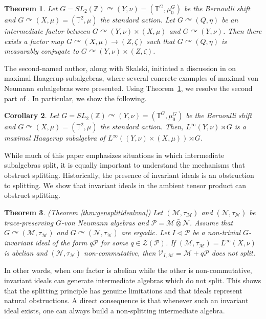 \documentclass[12pt]{amsart}
\newcommand{\cM}{{\mathcal M}}
\newcommand{\cP}{{\mathcal P}}
\newtheorem{thm}{Theorem}[section]
\newtheorem{cor}[thm]{Corollary}
\theoremstyle{definition}
\begin{document}
\begin{thm}
\label{thm:introtoricaction}
Let $G=SL_2(\mathbb{Z})\curvearrowright (Y,\nu)=(\mathbb{T}^{G},\mu_0^G)$ be the Bernoulli shift and $G\curvearrowright (X,\mu)=(\mathbb{T}^2,\mu)$ the standard action. Let $G\curvearrowright (Q,\eta)$ be an intermediate factor between $G\curvearrowright (Y,\nu)\times(X,\mu)$ and $G\curvearrowright (Y,\nu)$. Then there exists a factor map $G\curvearrowright (X,\mu)\to (Z,\zeta)$ such that $G\curvearrowright (Q,\eta)$ is measurably conjugate to $G\curvearrowright (Y,\nu)\times(Z,\zeta)$. 
\end{thm}
The second-named author, along with Skalski, initiated a discussion in \cite{jiangskalski} on maximal Haagerup subalgebras, where several concrete examples of maximal von Neumann subalgebras were presented. Using Theorem~\ref{thm:introtoricaction}, we resolve the second part of \cite[Problem~5.2]{jiangskalski}. In particular, we show the following. 
\begin{cor} 
\label{cor:mainmaximalhaagerup}
Let $G=SL_2(\mathbb{Z})\curvearrowright (Y,\nu)=(\mathbb{T}^{G},\mu_0^G)$ be the Bernoulli shift and $G\curvearrowright (X,\mu)=(\mathbb{T}^2,\mu)$ the standard action. Then, $L^\infty(Y,\nu)\rtimes G$ is a maximal Haagerup subalgebra of $L^\infty((Y,\nu)\times(X,\mu))\rtimes G$. 
\end{cor}
While much of this paper emphasizes situations in which intermediate subalgebras split, it is equally important to understand the mechanisms that obstruct splitting. Historically, the presence of invariant ideals is an obstruction to splitting.
We show that invariant ideals in the ambient tensor product can obstruct splitting.
\begin{thm}(Theorem \ref{thm:gensplitidealvna})
\label{thm:obstrucmain} Let $(\mathcal{M},\tau_{\mathcal{M}})$ and $(\mathcal{N},\tau_{\mathcal{N}})$ be trace-preserving $G$-von Neumann algebras and $\mathcal{P}=\mathcal{M}\bar\otimes\mathcal{N}$. Assume that $G\curvearrowright(\mathcal{M},\tau_{\mathcal{M}})$ and $G\curvearrowright(\mathcal{N},\tau_{\mathcal{N}})$ are ergodic. Let $I\triangleleft \mathcal{P}$ be a non-trivial $G$-invariant ideal of the form $q\mathcal{P}$ for some $q\in\mathcal{Z}(\mathcal{P})$. If $(\mathcal{M},\tau_{\mathcal{M}})=L^\infty(X,\nu)$ is abelian and $(\mathcal{N},\tau_{\mathcal{N}})$ non-commutative, then $\mathcal{V}_{I,\cM}=\cM+q\cP$ does not split. 
\end{thm}
In other words, when one factor is abelian while the other is non-commutative, invariant ideals can generate intermediate algebras which do not split. This shows that the splitting principle has genuine limitations and that ideals represent natural obstructions. A direct consequence is that whenever such an invariant ideal exists, one can always build a non-splitting intermediate algebra. 
\end{document}
